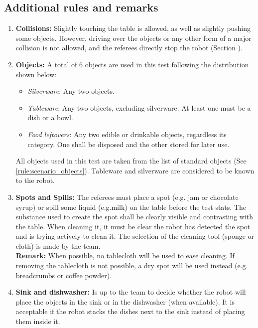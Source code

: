 \subsection{Additional rules and remarks}
\begin{enumerate}
	\item \textbf{Collisions:} Slightly touching the table is allowed, as well as slightly pushing some objects. However, driving over the objects or any other form of a major collision is not allowed, and the referees directly stop the robot (Section ).

	\item \textbf{Objects:} A total of 6 objects are used in this test following the distribution shown below:
	\begin{itemize}
		\item\textit{Silverware}: Any two objects.
		\item\textit{Tableware}: Any two objects, excluding silverware. At least one must be a dish or a bowl.
		\item\textit{Food leftovers}: Any two edible or drinkable objects, regardless its category. One shall be disposed and the other stored for later use.
	\end{itemize}
	All objects used in this test are taken from the list of standard objects (See \ref{rule:scenario_objects}). Tableware and silverware are considered to be known to the robot.

	\item \textbf{Spots and Spills:} The referees must place a spot (e.g. jam or chocolate syrup) or spill some liquid (e.g.milk) on the table before the test stats. The substance used to create the spot shall be clearly visible and contrasting with the table. When cleaning it, it must be clear the robot has detected the spot and is trying actively to clean it. The selection of the cleaning tool (sponge or cloth) is made by the team.\\
	\textbf{Remark:} When possible, no tablecloth will be used to ease cleaning. If removing the tablecloth is not possible, a dry spot will be used instead (e.g. breadcrumbs or coffee powder).

	\item \textbf{Sink and dishwasher:} Is up to the team to decide whether the robot will place the objects in the sink or in the dishwasher (when available). It is acceptable if the robot stacks the dishes next to the sink instead of placing them inside it.


\end{enumerate}
